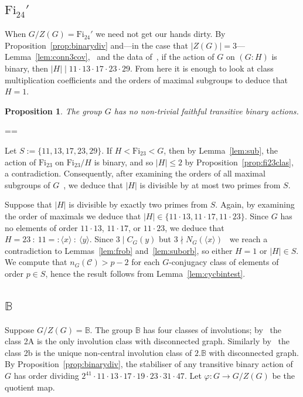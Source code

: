 \documentclass[11pt, a4paper]{amsart}
\makeatletter
\def\cn{\mathord{{\!\:{:}\:\!}}}
\newtheorem{prop}[thm]{Proposition}
\renewcommand{\proofname}{Proof}
\renewenvironment{proof}[1][\proofname]{\par
  \pushQED{\qed}  \normalfont \partopsep=\z@skip \topsep=\z@skip
  \trivlist
  \item[\hskip\labelsep
        \scshape
    #1\@addpunct{.}]\ignorespaces
}{  \popQED\endtrivlist\@endpefalse
}
\makeatother
\begin{document}
\subsection{$\mathrm{Fi}_{24}'$} When $G/Z(G)=\mathrm{Fi}_{24}'$ we need not get our hands dirty. By Proposition~\ref{prop:binarydiv} and---in the case that $|Z(G)|=3$---Lemma~\ref{lem:conn3cov},~\cite[Lemma 2.12]{CDP} and the data of~\cite[Table 8]{CDP}, if the action of $G$ on $(G:H)$ is binary, then $|H|\mid 11\cdot13\cdot17\cdot23\cdot29$. From here it is enough to look at class multiplication coefficients and the orders of maximal subgroups to deduce that $H=1$.
\begin{prop}
    The group $G$ has no non-trivial faithful transitive binary actions.
\end{prop}
\begin{proof}
    Let $S:=\{11,13,17,23,29\}$. If $H<\mathrm{Fi}_{23}< G$, then by Lemma~\ref{lem:sub}, the action of $\mathrm{Fi}_{23}$ on $\mathrm{Fi}_{23}/H$ is binary, and so $|H|\leq 2$ by Proposition~\ref{prop:fi23clas}, a contradiction. Consequently, after examining the orders of all maximal subgroups of $G$~\cite{LW91}, we deduce that $|H|$ is divisible by at most two primes from $S$.

    Suppose that $|H|$ is divisible by exactly two primes from $S$. Again, by examining the order of maximals we deduce that $|H|\in\{11\cdot13,11\cdot17,11\cdot23\}$. Since $G$ has no elements of order $11\cdot13$, $11\cdot17$, or $11\cdot23$, we deduce that $H=23\cn11=:\langle x\rangle\cn\langle y\rangle$. Since $3\mid C_G(y)$ but $3\nmid N_G(\langle x\rangle)$~\cite{atlas} we reach a contradiction to Lemmas~\ref{lem:frob} and~\ref{lem:suborb}, so either $H=1$ or $|H|\in S$. We compute that $n_G(\mathcal{C})>p-2$ for each $G$-conjugacy class of elements of order $p\in  S$, hence the result follows from Lemma~\ref{lem:cycbintest}.
\end{proof}
\subsection{$\mathbb{B}$} Suppose $G/Z(G)=\mathbb{B}$. The group $\mathbb{B}$ has four classes of involutions; by~\cite[Propositions 3.1, 3.2, 3.3]{CDP} the class 2A is the only involution class with disconnected graph. Similarly by~\cite[Theorem 4.2]{CDP} the class 2b is the unique non-central involution class of $2.\mathbb{B}$ with disconnected graph. By Proposition~\ref{prop:binarydiv}, the stabiliser of any transitive binary action of $G$ has order dividing $2^{41}\cdot11\cdot13\cdot17\cdot19\cdot23\cdot31\cdot47$. Let $\varphi:G\to G/Z(G)$ be the quotient map.
\end{document}
